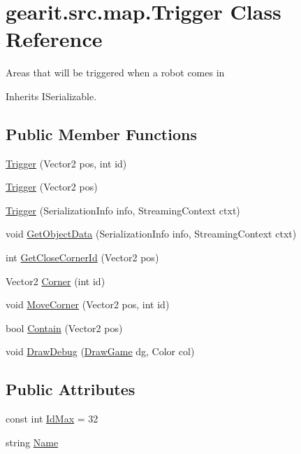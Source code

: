 \hypertarget{classgearit_1_1src_1_1map_1_1_trigger}{\section{gearit.\+src.\+map.\+Trigger Class Reference}
\label{classgearit_1_1src_1_1map_1_1_trigger}
}


Areas that will be triggered when a robot comes in  




Inherits I\+Serializable.

\subsection*{Public Member Functions}
\begin{DoxyCompactItemize}
\item 
\hyperlink{classgearit_1_1src_1_1map_1_1_trigger_a6dbcfcde414592cd29d87f5868db85d3}{Trigger} (Vector2 pos, int id)
\item 
\hyperlink{classgearit_1_1src_1_1map_1_1_trigger_a764e9add6641baff3cfc5af2d48b1a26}{Trigger} (Vector2 pos)
\item 
\hyperlink{classgearit_1_1src_1_1map_1_1_trigger_ae56325887273473c3535d214baacc101}{Trigger} (Serialization\+Info info, Streaming\+Context ctxt)
\item 
void \hyperlink{classgearit_1_1src_1_1map_1_1_trigger_a59b3065825a6ca46c1f22e956c6915ad}{Get\+Object\+Data} (Serialization\+Info info, Streaming\+Context ctxt)
\item 
int \hyperlink{classgearit_1_1src_1_1map_1_1_trigger_a12488425a65f31b10573b466244fe563}{Get\+Close\+Corner\+Id} (Vector2 pos)
\item 
Vector2 \hyperlink{classgearit_1_1src_1_1map_1_1_trigger_a8bdcf2351d419c27ad0766ee72e9ee67}{Corner} (int id)
\item 
void \hyperlink{classgearit_1_1src_1_1map_1_1_trigger_a7a7a84780dce3af0fc248d17cb5f5897}{Move\+Corner} (Vector2 pos, int id)
\item 
bool \hyperlink{classgearit_1_1src_1_1map_1_1_trigger_a63852ae167d2b73d9a83b64857b6e64c}{Contain} (Vector2 pos)
\item 
void \hyperlink{classgearit_1_1src_1_1map_1_1_trigger_a01ee77c12b290ebc4c56f47591096704}{Draw\+Debug} (\hyperlink{classgearit_1_1src_1_1_draw_game}{Draw\+Game} dg, Color col)
\end{DoxyCompactItemize}
\subsection*{Public Attributes}
\begin{DoxyCompactItemize}
\item 
const int \hyperlink{classgearit_1_1src_1_1map_1_1_trigger_aefa6f32ee5c2e56b0d8c558327ad8047}{Id\+Max} = 32
\item 
string \hyperlink{classgearit_1_1src_1_1map_1_1_trigger_a7a0302a533e52923f3e25a088825808a}{Name}
\end{DoxyCompactItemize}
